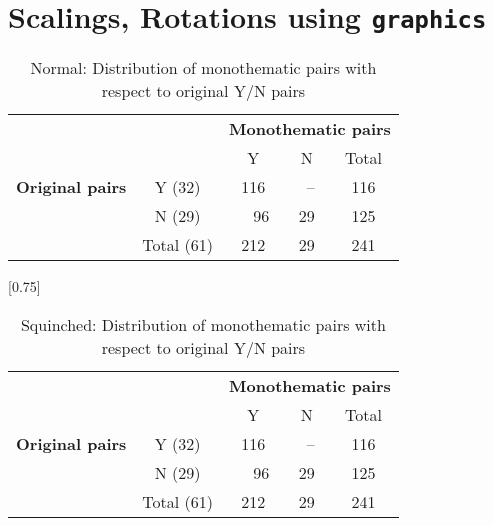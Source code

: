 \documentclass{article}
\begin{document}
\section{Scalings, Rotations using \texttt{graphics}}

\begin{table}[htb]
\centering
  \begin{tabular}{|c|c|c|c|c|} \hline
   \multicolumn{1}{|c|}{\multirow{5}{5pt}{\begin{rotatebox}{90}{{\footnotesize \textbf{Original pairs}}}\end{rotatebox}}} &
     \multicolumn{1}{|c|}{ } & \multicolumn{3}{|c|}{\textbf{Monothematic pairs}}\\ \cline{2-5}
     & & Y & N & Total \\ \cline{2-5}
     & Y (32) & 116 & \ -- &  116  \\ \cline{2-5}
     & N (29) & \ \ 96 & 29 & 125  \\ \cline{2-5}
     & Total (61) & 212 & 29 & 241  \\ \hline
  \end{tabular}
  \caption{Normal: Distribution of monothematic pairs with respect to original Y/N pairs}
  \label{tb:tab1}
\end{table}

\begin{table}[htb]
\scalebox{1.5}[0.75]{
\centering
  \begin{tabular}{|c|c|c|c|c|} \hline
   \multicolumn{1}{|c|}{\multirow{5}{5pt}{\begin{rotatebox}{90}{{\footnotesize \textbf{Original pairs}}}\end{rotatebox}}} &
     \multicolumn{1}{|c|}{ } & \multicolumn{3}{|c|}{\textbf{Monothematic pairs}}\\ \cline{2-5}
     & & Y & N & Total \\ \cline{2-5}
     & Y (32) & 116 & \ -- &  116  \\ \cline{2-5}
     & N (29) & \ \ 96 & 29 & 125  \\ \cline{2-5}
     & Total (61) & 212 & 29 & 241  \\ \hline
  \end{tabular}
  }
   \caption{Squinched: Distribution of monothematic pairs with respect to original Y/N pairs}
  \label{tb:tab2}
\end{table}
\end{document}
